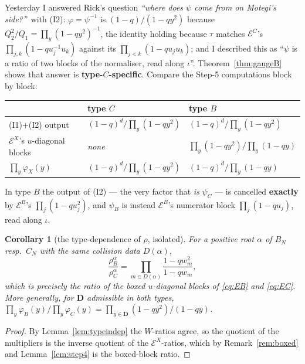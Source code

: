 \documentclass[11pt]{article}
\newtheorem{cor}[thm]{Corollary}
\theoremstyle{definition}
\newcommand{\bD}{\mathbf{D}}
\newcommand{\EB}{\mathcal{E}^{B}}
\newcommand{\EC}{\mathcal{E}^{C}}
\newcommand{\EX}{\mathcal{E}^{X}}
\begin{document}
Yesterday I answered Rick's question \emph{``where does $\psi$ come from on
Motegi's side?''}\ with (I2): $\varphi=\psi^{-1}$ is $(1-q)/(1-qy^{2})$ because
$Q_2^{2}/Q_1=\prod_y(1-qy^{2})^{-1}$, the identity holding because $\tau$ matches
$\EC$'s $\prod_{j,k}(1-qu_j^{-1}u_k)$ against its $\prod_{j<k}(1-qu_ju_k)$; and
I described this as ``$\psi$ is a ratio of two blocks of the normaliser, read
along $\iota$''.  Theorem~\ref{thm:gaugeB} shows that answer is
\textbf{type-$C$-specific}.  Compare the Step-5 computations block by block:
\begin{center}
\begin{tabular}{@{}lll@{}}
\toprule
 & type $C$ & type $B$\\
\midrule
(I1)+(I2) output & $(1-q)^{d}\big/\prod_y(1-qy^{2})$ & $(1-q)^{d}\big/\prod_y(1-qy^{2})$\\
$\EX$'s $u$-diagonal blocks & \emph{none} & $\prod_y(1-qy^{2})\big/\prod_y(1-qy)$\\
\midrule
$\prod_y\varphi_X(y)$ & $(1-q)^{d}\big/\prod_y(1-qy^{2})$ & $(1-q)^{d}\big/\prod_y(1-qy)$\\
\bottomrule
\end{tabular}
\end{center}
In type $B$ the output of (I2) --- the very factor that \emph{is} $\psi_C$ --- is
cancelled \textbf{exactly} by $\EB$'s $\prod_j(1-qu_j^{2})$, and $\psi_B$ is
instead $\EB$'s numerator block $\prod_j(1-qu_j)$, read along $\iota$.

\begin{cor}[the type-dependence of $\rho$, isolated]\label{cor:ratio}
For a positive root $\alpha$ of $B_N$ resp.\ $C_N$ with the same collision data
$D(\alpha)$,
\[
  \frac{\rho^{\alpha}_{B}}{\rho^{\alpha}_{C}}
  =\prod_{m\in D(\alpha)}\frac{1-qw_m^{2}}{1-qw_m},
\]
which is precisely the ratio of the boxed $u$-diagonal blocks of
\eqref{eq:EB} and \eqref{eq:EC}.  More generally, for $\bD$ admissible in both
types, $\prod_{y}\varphi_B(y)\big/\prod_{y}\varphi_C(y)
 =\prod_{y\in\bD}(1-qy^{2})/(1-qy)$.
\end{cor}

\begin{proof}
By Lemma~\ref{lem:typeindep} the $W$-ratios agree, so the quotient of the
multipliers is the inverse quotient of the $\EX$-ratios, which by
Remark~\ref{rem:boxed} and Lemma~\ref{lem:step4} is the boxed-block ratio.
\end{proof}
\end{document}
